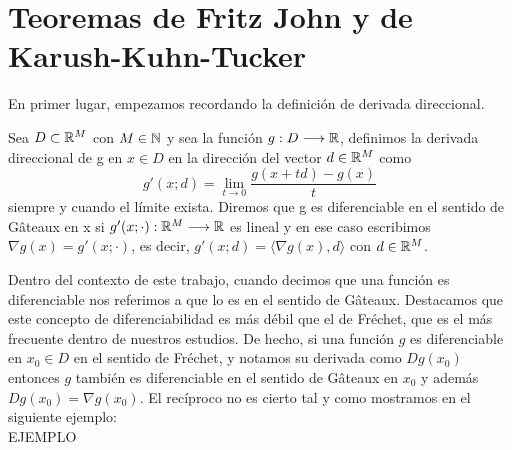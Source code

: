 \chapter{Teoremas de Fritz John y de Karush-Kuhn-Tucker}
		\newcommand{\barx}{\bar{x} }
		\newcommand{\dd}{\textbf{\emph{d}}}
		
	En primer lugar, empezamos recordando la definición de derivada direccional. 
	\begin{definicion}
			Sea $ D \subset \mathbb{R}^M $ con $ M \in \mathbb{N} $ y sea la función $ g: D \longrightarrow  \mathbb{R}$, definimos la derivada direccional de g en $ x \in D $ en la dirección del vector $ d\in \mathbb{R}^M $ como
			\[
			g'(x;d) = \lim_{t\rightarrow0}\frac{g(x+td) - g(x)}{t}
			\]
			siempre y cuando el límite exista. Diremos que g es diferenciable en el sentido de Gâteaux en x si $ g'(x;\cdot):\mathbb{R}^M \longrightarrow \mathbb{R} $ es lineal y en ese caso escribimos $ \nabla g(x) = g'(x;\cdot) $, es decir, $ g'(x;d) = \langle \nabla g(x), d\rangle $ con $ d \in \mathbb{R}^M $.
	\end{definicion}
	
	Dentro del contexto de este trabajo, cuando decimos que una función es diferenciable nos referimos a que lo es en el sentido de Gâteaux. Destacamos que este concepto de diferenciabilidad es más débil que el de Fréchet, que es el más frecuente dentro de nuestros estudios. De hecho, si una función $ g $ es diferenciable en $ x_0 \in D$ en el sentido de Fréchet, y notamos su derivada como $ Dg(x_0) $ entonces $ g $ también es diferenciable en el sentido de Gâteaux en $ x_0 $ y además $ Dg(x_0) = \nabla g(x_0) $. El recíproco no es cierto tal y como mostramos en el siguiente ejemplo:\\
	
	EJEMPLO \\
	
